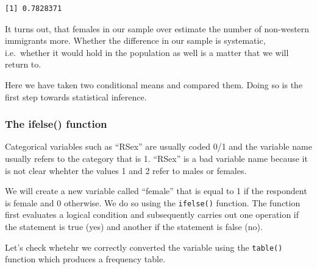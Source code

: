 \documentclass[]{article}
\newenvironment{Shaded}{\begin{snugshade}}{\end{snugshade}}
\newcommand{\DataTypeTok}[1]{\textcolor[rgb]{0.13,0.29,0.53}{#1}}
\newcommand{\DecValTok}[1]{\textcolor[rgb]{0.00,0.00,0.81}{#1}}
\newcommand{\KeywordTok}[1]{\textcolor[rgb]{0.13,0.29,0.53}{\textbf{#1}}}
\newcommand{\NormalTok}[1]{#1}
\newcommand{\OperatorTok}[1]{\textcolor[rgb]{0.81,0.36,0.00}{\textbf{#1}}}
\newcommand{\StringTok}[1]{\textcolor[rgb]{0.31,0.60,0.02}{#1}}
\begin{document}
\begin{verbatim}
[1] 0.7828371
\end{verbatim}

It turns out, that females in our sample over estimate the number of non-western immigrants more. Whether the difference in our sample is systematic, i.e.~whether it would hold in the population as well is a matter that we will return to.

Here we have taken two conditional means and compared them. Doing so is the first step towards statistical inference.

\hypertarget{the-ifelse-function}{%
\subsubsection{The ifelse() function}\label{the-ifelse-function}}

Categorical variables such as ``RSex'' are usually coded 0/1 and the variable name usually refers to the category that is 1. ``RSex'' is a bad variable name because it is not clear whehter the values 1 and 2 refer to males or females.

We will create a new variable called ``female'' that is equal to 1 if the respondent is female and 0 otherwise. We do so using the \texttt{ifelse()} function. The function first evaluates a logical condition and subsequently carries out one operation if the statement is true (yes) and another if the statement is false (no).

\begin{Shaded}
\end{Shaded}

Let's check whetehr we correctly converted the variable using the \texttt{table()} function which produces a frequency table.

\begin{Shaded}
\end{Shaded}
\end{document}
